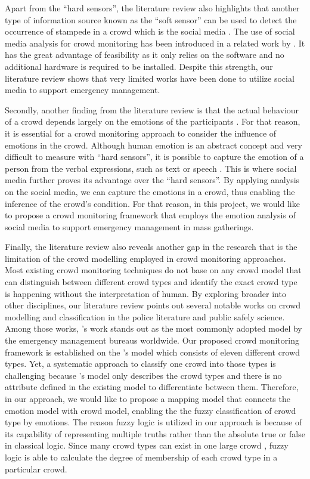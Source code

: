 Apart from the ``hard sensors'', the literature review also highlights that another type of information source known as the ``soft sensor'' can be used to detect the occurrence of stampede in a crowd which is the social media \citep{Ramesh2014}. The use of social media analysis for crowd monitoring has been introduced in a related work by \citet{DelirHaghighi2013}. It has the great advantage of feasibility as it only relies on the software and no additional hardware is required to be installed. Despite this strength, our literature review shows that very limited works have been done to utilize social media to support emergency management.

Secondly, another finding from the literature review is that the actual behaviour of a crowd depends largely on the emotions of the participants \citep{Kornblum2011, jasper2011emotions}. For that reason, it is essential for a crowd monitoring approach to consider the influence of emotions in the crowd. Although human emotion is an abstract concept and very difficult to measure with ``hard sensors'', it is possible to capture the emotion of a person from the verbal expressions, such as text \citep{alm2005emotions} or speech \citep{sobin1999emotion}. This is where social media further proves its advantage over the ``hard sensors''. By applying analysis on the social media, we can capture the emotions in a crowd, thus enabling the inference of the crowd's condition. For that reason, in this project, we would like to propose a crowd monitoring framework that employs the emotion analysis of social media to support emergency management in mass gatherings. 

Finally, the literature review also reveals another gap in the research that is the limitation of the crowd modelling employed in crowd monitoring approaches. Most existing crowd monitoring techniques do not base on any crowd model that can distinguish between different crowd types and identify the exact crowd type is happening without the interpretation of human. By exploring broader into other disciplines, our literature review points out several notable works on crowd modelling and classification in the police literature and public safely science. Among those works, \citet{Berlonghi1995}'s work stands out as the most commonly adopted model by the emergency management bureaus worldwide. Our proposed crowd monitoring framework is established on the \citet{Berlonghi1995}'s model which consists of eleven different crowd types. Yet, a systematic approach to classify one crowd into those types is challenging because \citet{Berlonghi1995}'s model only describes the crowd types and there is no attribute defined in the existing model to differentiate between them. Therefore, in our approach, we would like to propose a mapping model that connects the emotion model with crowd model, enabling the the fuzzy classification of crowd type by emotions. The reason fuzzy logic is utilized in our approach is because of its capability of representing multiple truths rather than the absolute true or false in classical logic. Since many crowd types can exist in one large crowd \citep{Berlonghi1995}, fuzzy logic is able to calculate the degree of membership of each crowd type in a particular crowd.

